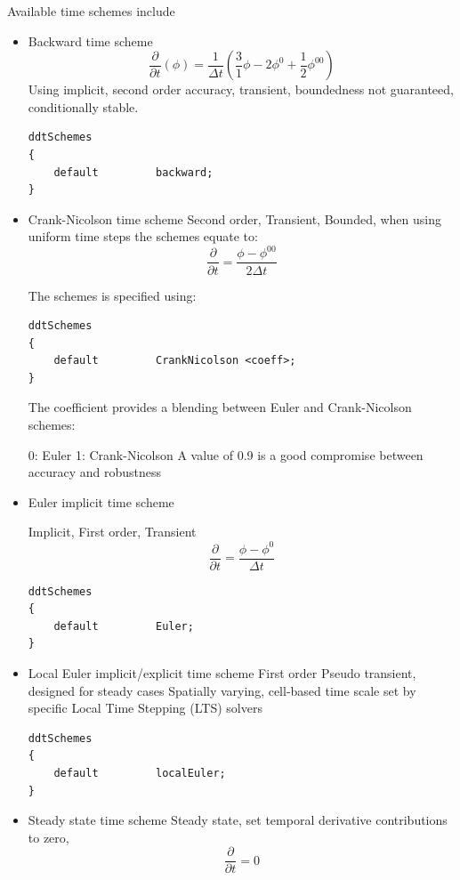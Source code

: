 \documentclass{article}
\begin{document}
Available time schemes include
\begin{itemize}
\item Backward time scheme
\begin{equation}
\frac{\partial}{\partial t}(\phi) = \frac{1}{\Delta t}(\frac{3}{1}\phi - 2\phi^0 + \frac{1}{2} \phi^{00})
\end{equation}
Using implicit, second order accuracy, transient, boundedness not guaranteed, conditionally stable. 

\begin{verbatim}
ddtSchemes
{
    default         backward;
}
\end{verbatim}

\item Crank-Nicolson time scheme
Second order, Transient, Bounded, when using uniform time steps the schemes equate to: 
\begin{equation}
\frac{\partial}{\partial t} = \frac{\phi - \phi^{00}}{2\Delta t}
\end{equation}

The schemes is specified using: 

\begin{verbatim}
ddtSchemes
{
    default         CrankNicolson <coeff>;
}
\end{verbatim}

The coefficient provides a blending between Euler and Crank-Nicolson schemes:

0: Euler
1: Crank-Nicolson
A value of 0.9 is a good compromise between accuracy and robustness

\item Euler implicit time scheme

Implicit, First order, Transient 
\begin{equation}
\frac{\partial}{\partial t} = \frac{\phi - \phi^0}{\Delta t}
\end{equation}

\begin{verbatim}
ddtSchemes
{
    default         Euler;
}
\end{verbatim}


\item Local Euler implicit/explicit time scheme
First order
Pseudo transient, designed for steady cases
Spatially varying, cell-based time scale set by specific Local Time Stepping (LTS) solvers

\begin{verbatim}
ddtSchemes
{
    default         localEuler;
}
\end{verbatim}

\item Steady state time scheme
Steady state, set temporal derivative contributions to zero, 
\begin{equation}
\frac{\partial}{\partial t} = 0
\end{equation}
\end{itemize}
\end{document}
